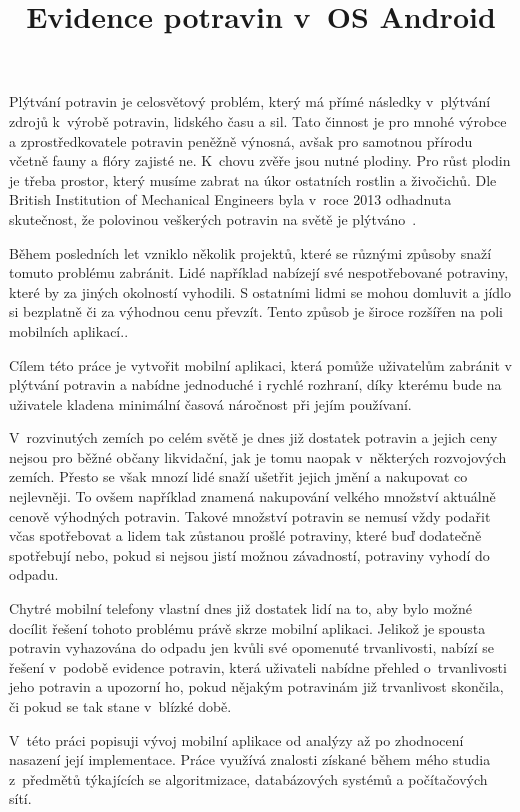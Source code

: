 \documentclass[thesis=B,czech]{FITthesis}[2013/10/20]
\title{Evidence potravin v~OS Android}
\begin{document}
\sloppy


\begin{introduction}

Plýtvání potravin je celosvětový problém, který má přímé následky v~plýtvání zdrojů k~výrobě potravin, lidského času a sil. Tato činnost je pro mnohé výrobce a zprostředkovatele potravin peněžně výnosná, avšak pro samotnou přírodu včetně fauny a flóry zajisté ne. K~chovu zvěře jsou nutné plodiny. Pro růst plodin je třeba prostor, který musíme zabrat na úkor ostatních rostlin a živočichů. Dle British Institution of Mechanical Engineers byla v~roce 2013 odhadnuta skutečnost, že polovinou veškerých potravin na světě je plýtváno~\cite{fakta}.

Během posledních let vzniklo několik projektů, které se různými způsoby snaží tomuto problému zabránit. Lidé například nabízejí své nespotřebované potraviny, které by za jiných okolností vyhodili. S ostatními lidmi se mohou domluvit a jídlo si bezplatně či za výhodnou cenu převzít. Tento způsob je široce rozšířen na poli mobilních aplikací..

Cílem této práce je vytvořit mobilní aplikaci, která pomůže uživatelům zabránit v plýtvání potravin a nabídne jednoduché i rychlé rozhraní, díky kterému bude na uživatele kladena minimální časová náročnost při jejím používaní.

V~rozvinutých zemích po celém světě je dnes již dostatek potravin a jejich ceny nejsou pro běžné občany likvidační, jak je tomu naopak v~některých rozvojových zemích. Přesto se však mnozí lidé snaží ušetřit jejich jmění a nakupovat co nejlevněji. To ovšem například znamená nakupování velkého množství aktuálně cenově výhodných potravin. Takové množství potravin se nemusí vždy podařit včas spotřebovat a lidem tak zůstanou prošlé potraviny, které buď dodatečně spotřebují nebo, pokud si nejsou jistí možnou závadností, potraviny vyhodí do odpadu.

Chytré mobilní telefony vlastní dnes již dostatek lidí na to, aby bylo možné docílit řešení tohoto problému právě skrze mobilní aplikaci. Jelikož je spousta potravin vyhazována do odpadu jen kvůli své opomenuté trvanlivosti, nabízí se řešení v~podobě evidence potravin, která uživateli nabídne přehled o~trvanlivosti jeho potravin a upozorní ho, pokud nějakým potravinám již trvanlivost skončila, či pokud se tak stane v~blízké době.

V~této práci popisuji vývoj mobilní aplikace od analýzy až po zhodnocení nasazení její implementace. Práce využívá znalosti získané během mého studia z~předmětů týkajících se algoritmizace, databázových systémů a počítačových sítí.

\end{introduction}
\end{document}
